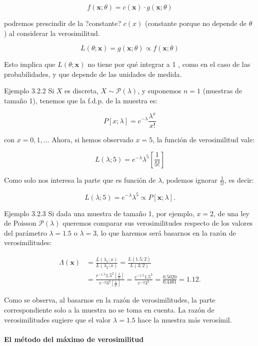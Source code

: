 \documentclass[
]{article}
\begin{document}
\[
f(\mathbf{x} ; \theta)=c(\mathbf{x}) \cdot g(\mathbf{x} ; \theta)
\]

podremos prescindir de la ?constante? \(c(x)\) (constante porque no depende de \(\theta\) ) al considerar la verosimilitud.

\[
L(\theta ; \mathbf{x})=g(\mathbf{x} ; \theta) \propto f(\mathbf{x} ; \theta)
\]

Esto implica que \(L(\theta ; \mathbf{x})\) no tiene por qué integrar a 1 , como en el caso de las probabilidades, y que depende de las unidades de medida.

Ejemplo 3.2.2 Si \(X\) es discreta, \(X \sim \mathcal{P}(\lambda)\), y suponemos \(n=1\) (muestras de tamaño 1), tenemos que la f.d.p. de la muestra es:

\[
P[x ; \lambda]=e^{-\lambda} \frac{\lambda^{x}}{x!}
\]

con \(x=0,1, \ldots\) Ahora, si hemos observado \(x=5\), la función de verosimilitud vale:

\[
L(\lambda ; 5)=e^{-\lambda} \lambda^{5}\left[\frac{1}{5!}\right]
\]

Como solo nos interesa la parte que es función de \(\lambda\), podemos ignorar \(\frac{1}{5!}\), es decir:

\[
L(\lambda ; 5)=e^{-\lambda} \lambda^{5} \propto P[\mathbf{x} ; \lambda] .
\]

Ejemplo 3.2.3 Si dada una muestra de tamaño 1, por ejemplo, \(x=2\), de una ley de Poisson \(\mathcal{P}(\lambda)\) queremos comparar sus verosimilitudes respecto de los valores del parámetro \(\lambda=1.5\) o \(\lambda=3\), lo que haremos será basarnos en la razón de verosimilitudes:

\[
\begin{aligned}
\Lambda(\mathbf{x}) & =\frac{L\left(\lambda_{1} ; x\right)}{L\left(\lambda_{2} ; x\right)}=\frac{L(1.5 ; 2)}{L(3 ; 2)} \\
& =\frac{e^{-1.5} 1.5^{2}\left[\frac{1}{2!}\right]}{e^{-3} 3^{2}\left[\frac{1}{2!}\right]}=\frac{e^{-1.5} 1.5^{2}}{e^{-3} 3^{2}}=\frac{0.5020}{0.4481}=1.12 .
\end{aligned}
\]

Como se observa, al basarnos en la razón de verosimilitudes, la parte correspondiente solo a la muestra no se toma en cuenta. La razón de verosimilitudes sugiere que el valor \(\lambda=1.5\) hace la muestra más verosímil.

\paragraph{El método del máximo de verosimilitud}\label{el-muxe9todo-del-muxe1ximo-de-verosimilitud-1}
\end{document}
